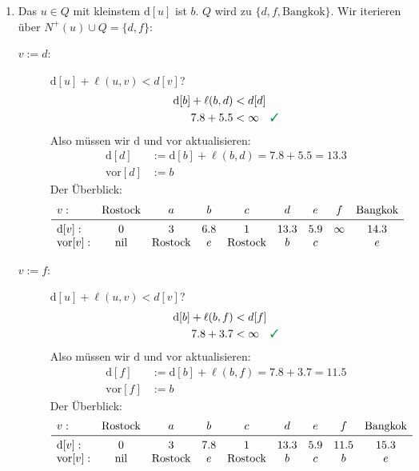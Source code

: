 \documentclass[
a4paper, %
11pt,
]
{scrartcl}
\newcommand{\dist}{\text{d}}
\newcommand{\vor}{\text{vor}}
\newcommand{\nil}{\text{nil}}
\begin{document}
\begin{enumerate}
  \item Das $u \in Q$ mit kleinstem $\dist[u]$ ist $b$.
    $Q$ wird zu $\{ d, f, \text{Bangkok}\}$.
    Wir iterieren über $N^+(u) \cup Q = \{ d, f \}$:

    \begin{description}
      \item[$v := d$:] $\dist[u] + \ell(u, v) < d[v]$?
        \begin{align*}
          \dist[b] + \ell(b, d) & < d[d]\\
          \num{7,8} + \num{5,5} & < \infty \quad \richtig
        \end{align*}
        Also müssen wir $\dist$ und $\vor$ aktualisieren:
        \begin{align*}
          \dist[d] & := \dist[b] + \ell(b, d)
            = \num{7,8} + \num{5,5}= \num{13,3}\\
          \vor[d] & := b
        \end{align*}
        Der Überblick:
        \begin{align*}
          \begin{array}{lcccccccc}
            v: & \text{Rostock} & a & b & c & d & e & f & \text{Bangkok}\\
            \midrule
            \dist[v]:
              & 0 & 3 & \num{6,8} & 1 & \num{13,3} & \num{5,9} & \infty & \num{14,3}\\
            \vor[v]:
              & \nil & \text{Rostock} & e & \text{Rostock} & b & c & & e
          \end{array}
        \end{align*}

      \item[$v := f$:] $\dist[u] + \ell(u, v) < d[v]$?
        \begin{align*}
          \dist[b] + \ell(b, f) & < d[f]\\
          \num{7,8} + \num{3,7} & < \infty \quad \richtig
        \end{align*}
        Also müssen wir $\dist$ und $\vor$ aktualisieren:
        \begin{align*}
          \dist[f] & := \dist[b] + \ell(b, f)
            = \num{7,8} + \num{3,7}= \num{11,5}\\
          \vor[f] & := b
        \end{align*}
        Der Überblick:
        \begin{align*}
          \begin{array}{lcccccccc}
            v: & \text{Rostock} & a & b & c & d & e & f & \text{Bangkok}\\
            \midrule
            \dist[v]:
              & 0 & 3 & \num{7,8} & 1 & \num{13,3} & \num{5,9} & \num{11,5} & \num{15,3}\\
            \vor[v]:
              & \nil & \text{Rostock} & e & \text{Rostock} & b & c & b & e
          \end{array}
        \end{align*}
    \end{description}


\end{enumerate}
\end{document}
